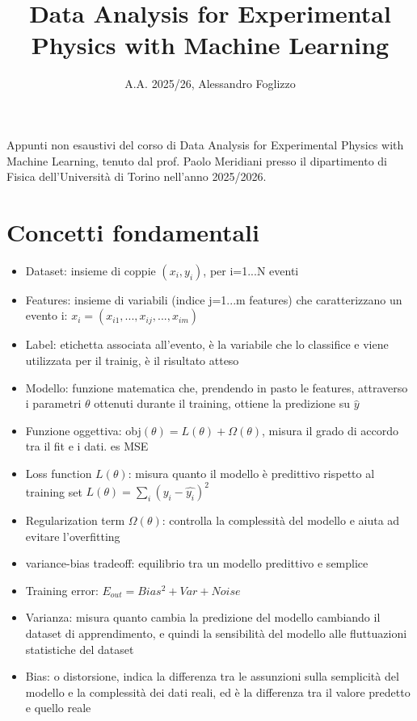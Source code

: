 \documentclass{article}
\begin{document}
\title{Data Analysis for Experimental Physics with Machine Learning}

\author{A.A. 2025/26, Alessandro Foglizzo}
\date{}
\maketitle

Appunti non esaustivi del corso di Data Analysis for Experimental Physics with Machine Learning, tenuto dal prof. Paolo Meridiani presso il dipartimento di Fisica dell'Università di Torino
nell'anno 2025/2026.

\section*{Concetti fondamentali}
\begin{itemize}
    \item Dataset: insieme di coppie $(x_i,y_i)$, per i=1...N eventi
    \item Features: insieme di variabili (indice j=1...m features) che caratterizzano un evento i: $x_i=(x_{i1}, ..., x_{ij}, ..., x_{im})$
    \item Label: etichetta associata all'evento, è la variabile che lo classifice e viene utilizzata per il trainig, è il risultato atteso
    \item Modello: funzione matematica che, prendendo in pasto le features, attraverso i parametri $\theta$ ottenuti durante il training, ottiene la predizione su $\hat{y}$
    \item Funzione oggettiva: obj$(\theta)=L(\theta)+\Omega(\theta)$, misura il grado di accordo tra il fit e i dati. es MSE
    \item Loss function $L(\theta)$: misura quanto il modello è predittivo rispetto al training set $ L(\theta) = \sum_{i}(y_i-\hat{y_i})^2 $
    \item Regularization term $\Omega(\theta)$: controlla la complessità del modello e aiuta ad evitare l'overfitting
    \item variance-bias tradeoff: equilibrio tra un modello predittivo e semplice
    \item Training error: $E_{out}=Bias^2+Var+Noise$
    \item Varianza: misura quanto cambia la predizione del modello cambiando il dataset di apprendimento, e quindi la sensibilità del modello alle fluttuazioni statistiche del dataset
    \item Bias: o distorsione, indica la differenza tra le assunzioni sulla semplicità del modello e la complessità dei dati reali, ed è la differenza tra il valore predetto e quello reale

\end{itemize}
\end{document}
